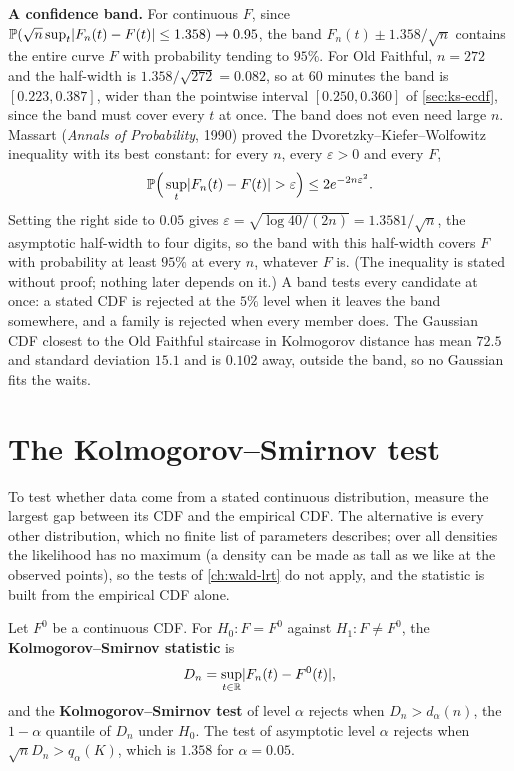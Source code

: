 \textbf{A confidence band.}
For continuous $F$, since $\mathbb{P}(\sqrt{n}\sup_t\lvert F_n(t) - F(t)\rvert \leq 1.358) \to 0.95$, the band $F_n(t) \pm 1.358/\sqrt{n}$ contains the entire curve $F$ with probability tending to $95\%$.
For Old Faithful, $n = 272$ and the half-width is $1.358/\sqrt{272} = 0.082$, so at $60$ minutes the band is $[0.223, 0.387]$, wider than the pointwise interval $[0.250, 0.360]$ of \cref{sec:ks-ecdf}, since the band must cover every $t$ at once.
The band does not even need large $n$.
Massart (\textit{Annals of Probability}, 1990) proved the Dvoretzky--Kiefer--Wolfowitz inequality with its best constant: for every $n$, every $\varepsilon > 0$ and every $F$,
\[
\mathbb{P}\Big(\sup_t\lvert F_n(t) - F(t)\rvert > \varepsilon\Big) \leq 2e^{-2n\varepsilon^2}.
\]
Setting the right side to $0.05$ gives $\varepsilon = \sqrt{\log 40/(2n)} = 1.3581/\sqrt{n}$, the asymptotic half-width to four digits, so the band with this half-width covers $F$ with probability at least $95\%$ at every $n$, whatever $F$ is.
(The inequality is stated without proof; nothing later depends on it.)
A band tests every candidate at once: a stated CDF is rejected at the $5\%$ level when it leaves the band somewhere, and a family is rejected when every member does.
The Gaussian CDF closest to the Old Faithful staircase in Kolmogorov distance has mean $72.5$ and standard deviation $15.1$ and is $0.102$ away, outside the band, so no Gaussian fits the waits.

\section{The Kolmogorov--Smirnov test}
\label{sec:ks-test}

To test whether data come from a stated continuous distribution, measure the largest gap between its CDF and the empirical CDF.
The alternative is every other distribution, which no finite list of parameters describes; over all densities the likelihood has no maximum (a density can be made as tall as we like at the observed points), so the tests of \cref{ch:wald-lrt} do not apply, and the statistic is built from the empirical CDF alone.

\begin{definition}
\label{def:ks-test}
Let $F^0$ be a continuous CDF. For $H_0: F = F^0$ against $H_1: F \neq F^0$, the \textbf{Kolmogorov--Smirnov statistic} is
\[
D_n = \sup_{t \in \mathbb{R}}\lvert F_n(t) - F^0(t)\rvert,
\]
and the \textbf{Kolmogorov--Smirnov test} of level $\alpha$ rejects when $D_n > d_\alpha(n)$, the $1 - \alpha$ quantile of $D_n$ under $H_0$. The test of asymptotic level $\alpha$ rejects when $\sqrt{n}D_n > q_\alpha(K)$, which is $1.358$ for $\alpha = 0.05$.
\end{definition}

